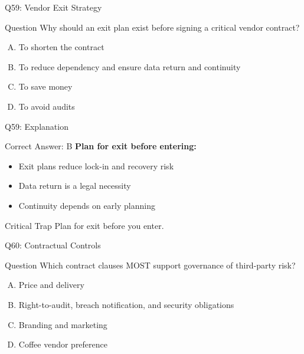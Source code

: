 \documentclass{beamer}
\begin{document}
	\begin{frame}{Q59: Vendor Exit Strategy}
		\begin{block}{Question}
			Why should an exit plan exist before signing a critical vendor contract?
		\end{block}
		\begin{enumerate}[(A)]
			\item To shorten the contract
			\item To reduce dependency and ensure data return and continuity
			\item To save money
			\item To avoid audits
		\end{enumerate}
	\end{frame}
	
	\begin{frame}{Q59: Explanation}
		\begin{block}{Correct Answer: B}
			\textbf{Plan for exit before entering:}
			\begin{itemize}
				\item Exit plans reduce lock-in and recovery risk
				\item Data return is a legal necessity
				\item Continuity depends on early planning
			\end{itemize}
		\end{block}
		\begin{alertblock}{Critical Trap}
			Plan for exit before you enter.
		\end{alertblock}
	\end{frame}
	
	\begin{frame}{Q60: Contractual Controls}
		\begin{block}{Question}
			Which contract clauses MOST support governance of third-party risk?
		\end{block}
		\begin{enumerate}[(A)]
			\item Price and delivery
			\item Right-to-audit, breach notification, and security obligations
			\item Branding and marketing
			\item Coffee vendor preference
		\end{enumerate}
	\end{frame}
	
\end{document}
